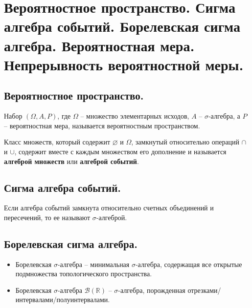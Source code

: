\section{Вероятностное пространство. Сигма алгебра событий. Борелевская сигма алгебра. Вероятностная мера. Непрерывность вероятностной меры.}

\subsection{Вероятностное пространство.}

\begin{definition}
    Набор $(\Omega, A, P)$, где $\Omega$ -- множество элементарных исходов, $A$ -- $\sigma$-алгебра, а $P$ -- вероятностная мера, называется вероятностным пространством.
\end{definition}

\begin{definition}
    Класс множеств, который содержит $\varnothing$ и $\Omega$, замкнутый относительно операций $\cap$ и $\cup$, содержит вместе с каждым множеством его дополнение и называется \textbf{алгеброй множеств} или \textbf{алгеброй событий}.
\end{definition}

\subsection{Сигма алгебра событий.}
\begin{definition}
    Если алгебра событий замкнута относительно счетных объединений и пересечений, то ее называют $\sigma$-алгеброй. 
\end{definition}

\subsection{Борелевская сигма алгебра.}
\begin{definition}
    \text{}
    \begin{itemize}
        \item Борелевская $\sigma$-алгебра -- минимальная $\sigma$-алгебра, содержащая все открытые подмножества топологического пространства.
        \item Борелевская $\sigma$-алгебра $\mathcal{B}(\mathbb{R})$  -- $\sigma$-алгебра, порожденная отрезками/интервалами/полуинтервалами.
    \end{itemize}
\end{definition}

